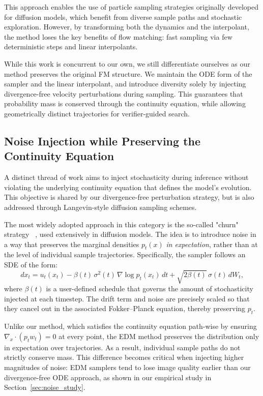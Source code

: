 \documentclass{article}
\begin{document}
This approach enables the use of particle sampling strategies originally developed for diffusion models, which benefit from diverse sample paths and stochastic exploration. However, by transforming both the dynamics and the interpolant, the method loses the key benefits of flow matching: fast sampling via few deterministic steps and linear interpolants.

While this work is concurrent to our own, we still differentiate ourselves as our method preserves the original FM structure. We maintain the ODE form of the sampler and the linear interpolant, and introduce diversity solely by injecting divergence-free velocity perturbations during sampling. This guarantees that probability mass is conserved through the continuity equation, while allowing geometrically distinct trajectories for verifier-guided search.

\subsection{Noise Injection while Preserving the Continuity Equation}

A distinct thread of work aims to inject stochasticity during inference without violating the underlying continuity equation that defines the model's evolution. This objective is shared by our divergence-free perturbation strategy, but is also addressed through Langevin-style diffusion sampling schemes.

The most widely adopted approach in this category is the so-called "churn" strategy ~\cite{karras2022elucidatingdesignspacediffusionbased}, used extensively in diffusion models. The idea is to introduce noise in a way that preserves the marginal densities \(p_t(x)\) \emph{in expectation}, rather than at the level of individual sample trajectories. Specifically, the sampler follows an SDE of the form:
\[
d x_t = u_t(x_t) - \beta(t)\,\sigma^2(t)\,\nabla \log p_t(x_t)\,dt + \sqrt{2\beta(t)}\,\sigma(t)\,dW_t,
\]
where \(\beta(t)\) is a user-defined schedule that governs the amount of stochasticity injected at each timestep. The drift term and noise are precisely scaled so that they cancel out in the associated Fokker–Planck equation, thereby preserving \(p_t\).

Unlike our method, which satisfies the continuity equation path-wise by ensuring \(\nabla_x\!\cdot(p_t w_t)=0\) at every point, the EDM method preserves the distribution only in expectation over trajectories. As a result, individual sample paths do not strictly conserve mass. This difference becomes critical when injecting higher magnitudes of noise: EDM samplers tend to lose image quality earlier than our divergence-free ODE approach, as shown in our empirical study in Section~\ref{sec:noise_study}.
\end{document}
